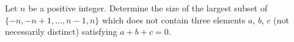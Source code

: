 Let $n$ be a positive integer.  Determine the size of the largest subset of $\{ -n, -n+1, \dots, n-1, n\}$ which does not contain three elements $a$,  $b$,  $c$ (not necessarily distinct) satisfying $a+b+c=0$.